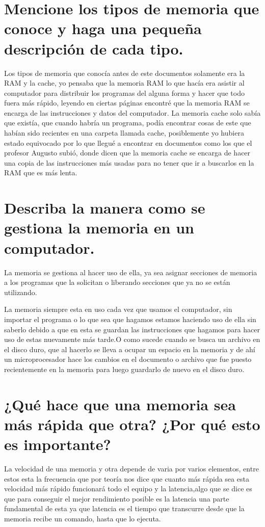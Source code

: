 \documentclass{article}
\begin{document}
\section{Mencione los tipos de memoria que conoce y haga una pequeña descripción de cada tipo.} \label{contenido}
Los tipos de memoria que conocía antes de este documentos solamente era la RAM y la cache, yo pensaba que la memoria RAM lo que hacía era asistir al computador para 
distribuir los programas del alguna forma y hacer que todo fuera más rápido, leyendo en ciertas páginas encontré que la memoria RAM se encarga de las instrucciones y
datos del computador.
La memoria cache solo sabía que existía, que cuando habría un programa, podía encontrar cosas de este que habían sido recientes en una carpeta llamada cache,
posiblemente yo hubiera estado equivocado por lo que llegué a encontrar en documentos como los que el profesor Augusto subió, donde dicen que la memoria
cache se encarga de hacer una copia de las instrucciones más usadas para no tener que ir a buscarlos en la RAM que es más lenta.


\section{Describa la manera como se gestiona la memoria en un computador.}
%
La memoria se gestiona al hacer uso de ella, ya sea asignar secciones de memoria a los programas que la solicitan o liberando secciones que ya no se están utilizando.

La memoria siempre esta en uso cada vez que usamos el computador, sin importar el programa o lo que sea que hagamos estamos haciendo uso de ella sin saberlo debido a que en esta se guardan las instrucciones que hagamos para hacer uso de estas nuevamente más tarde.O como sucede cuando se busca un archivo en el disco duro, que al hacerlo se lleva a ocupar un espacio en la memoria y de ahí un microprocesador hace los cambios en el documento o archivo que fue puesto recientemente en la memoria para luego guardarlo de nuevo en el disco duro.



\section{¿Qué hace que una memoria sea más rápida que otra? ¿Por qué esto es importante?} 



La velocidad de una memoria y otra depende de varia por varios elementos, entre estos esta la frecuencia que por teoría nos dice que cuanto más rápida sea esta velocidad más rápido funcionará todo el equipo y la latencia,algo que se dice es que para  conseguir el mejor rendimiento posible es la latencia una parte fundamental de esta ya que latencia es el tiempo que transcurre desde que la memoria recibe un comando, hasta que lo ejecuta.
\end{document}
